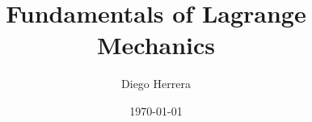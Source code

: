 \author[DH]{Diego Herrera}
\title[Lagrange]{Fundamentals of Lagrange Mechanics}
\date{\today}

\makeatletter
{}
\makeatother

\renewcommand{\PrelimWords}{[Lagrange -- DH -- v. 1.0.0]}
